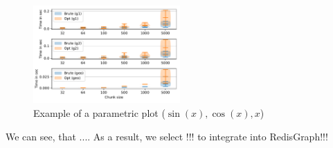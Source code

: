 \begin{figure}[h]
\centering
\includegraphics[width=0.5\textwidth]{data/raw/pathways.pdf}
\caption{Example of a parametric plot ($\sin (x), \cos(x), x$)}
\end{figure}


We can see, that ....
As a result, we select !!! to integrate into RedisGraph!!!